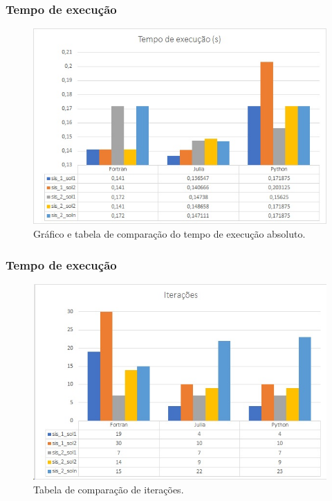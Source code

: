 \documentclass[aspectratio=1610]{beamer}
\begin{document}
\begin{frame}
\frametitle{Tempo de execução}


\begin{figure}
  \centering
  \includegraphics[scale=0.55]{Imagens/graf.jpg}
  \caption{Gráfico e tabela de comparação do tempo de execução absoluto.}
\end{figure}


\end{frame}



\begin{frame}
\frametitle{Tempo de execução}


\begin{figure}
  \centering
  \includegraphics[scale=0.55]{Imagens/iter.jpg}
  \caption{Tabela de comparação de iterações.}
\end{figure}


\end{frame}
\end{document}

